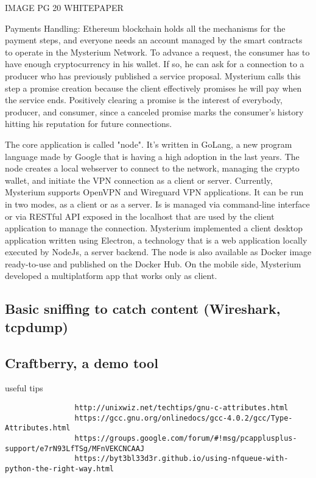 \documentclass[]{article}
\begin{document}
	IMAGE PG 20 WHITEPAPER

	Payments Handling: Ethereum blockchain holds all the mechanisms for the payment steps, and everyone needs an account managed by the smart contracts to operate in the Mysterium Network. To advance a request, the consumer has to have enough cryptocurrency in his wallet. If so, he can ask for a connection to a producer who has previously published a service proposal. Mysterium calls this step a promise creation because the client effectively promises he will pay when the service ends.  Positively clearing a promise is the interest of everybody, producer, and consumer, since a canceled promise marks the consumer's history hitting his reputation for future connections.





	
	The core application is called "node". It's written in GoLang, a new program language made by Google that is having a high adoption in the last years. The node creates a local webserver to connect to the network, managing the crypto wallet, and initiate the VPN connection as a client or server. Currently, Mysterium supports OpenVPN and Wireguard VPN applications.
	It can be run in two modes, as a client or as a server.
	Is is managed via command-line interface or via RESTful API exposed in the localhost that are used by the client application to manage the connection. Mysterium implemented a client desktop application written using Electron, a technology that is a web application locally executed by NodeJs, a server backend.
	The node is also available as Docker image ready-to-use and published on the Docker Hub.
	On the mobile side, Mysterium developed a multiplatform app that works only as client.











	\subsection{Basic sniffing to catch content (Wireshark, tcpdump)}
	\subsection{Craftberry, a demo tool}
			useful tips
			\begin{verbatim}
				http://unixwiz.net/techtips/gnu-c-attributes.html
				https://gcc.gnu.org/onlinedocs/gcc-4.0.2/gcc/Type-Attributes.html
				https://groups.google.com/forum/#!msg/pcapplusplus-support/e7rN93LfTSg/MFnVEKCNCAAJ
				https://byt3bl33d3r.github.io/using-nfqueue-with-python-the-right-way.html
			\end{verbatim}
			
\end{document}

